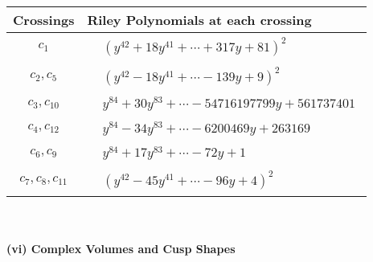 \documentclass[1p]{elsarticle_modified}
\theoremstyle{definition}
\begin{document}
\begin{tabular}{m{50pt}|m{274pt}}
Crossings & \hspace{64pt}Riley Polynomials at each crossing \\
\hline $$\begin{aligned}c_{1}\end{aligned}$$&$\begin{aligned}
&(y^{42}+18 y^{41}+\cdots+317 y+81)^{2}
\end{aligned}$\\
\hline $$\begin{aligned}c_{2},c_{5}\end{aligned}$$&$\begin{aligned}
&(y^{42}-18 y^{41}+\cdots-139 y+9)^{2}
\end{aligned}$\\
\hline $$\begin{aligned}c_{3},c_{10}\end{aligned}$$&$\begin{aligned}
&y^{84}+30 y^{83}+\cdots-54716197799 y+561737401
\end{aligned}$\\
\hline $$\begin{aligned}c_{4},c_{12}\end{aligned}$$&$\begin{aligned}
&y^{84}-34 y^{83}+\cdots-6200469 y+263169
\end{aligned}$\\
\hline $$\begin{aligned}c_{6},c_{9}\end{aligned}$$&$\begin{aligned}
&y^{84}+17 y^{83}+\cdots-72 y+1
\end{aligned}$\\
\hline $$\begin{aligned}c_{7},c_{8},c_{11}\end{aligned}$$&$\begin{aligned}
&(y^{42}-45 y^{41}+\cdots-96 y+4)^{2}
\end{aligned}$\\
\hline
\end{tabular}\\~\\
\newpage\flushleft \textbf{(vi) Complex Volumes and Cusp Shapes}
\end{document}
